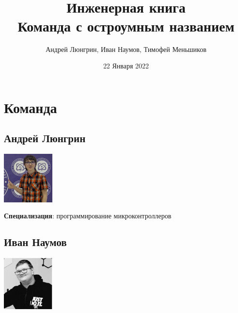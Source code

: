 \documentclass[11pt]{article}
\author{Андрей Люнгрин, Иван Наумов, Тимофей Меньшиков}
\date{22 Января 2022}
\title{Инженерная книга\\\medskip
\large Команда с остроумным названием}
\let\oldsection\section
\renewcommand\section{\pagebreak\oldsection}
\begin{document}
\maketitle
\tableofcontents


\section{Команда}
\label{sec:org6a2a280}
\subsection{Андрей Люнгрин}
\label{sec:orgb06aee4}
\begin{center}
\includegraphics[width=100]{./images/andrey.jpeg}
\end{center}

\textbf{Специализация}: программирование микроконтроллеров
\subsection{Иван Наумов}
\label{sec:orge2032dd}
\begin{center}
\includegraphics[width=100]{./images/ivan.jpg}
\end{center}
\end{document}
